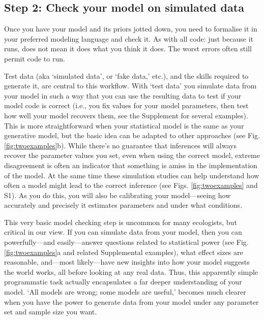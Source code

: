 \documentclass[11pt]{article}
\begin{document}
\subsection*{Step 2: Check your model on simulated data} 

Once you have your model and its priors jotted down, you need to formalise it in your preferred modeling language and check it. As with all code: just because it runs, does not mean it does what you think it does. The worst errors often still permit code to run. 

Test data (aka `simulated data', or  `fake data,' etc.), and the skills required to generate it, are central to this workflow. With `test data' you simulate data from your model in such a way that you can use the resulting data to test if your model code is correct (i.e., you fix values for your model parameters, then test how well your model recovers them, see the Supplement for several examples). This is more straightforward when your statistical model is the same as your generative model, but the basic idea can be adapted to other approaches (see Fig. \ref{fig:twoexamples}b). While there's no guarantee that inferences will always recover the parameter values you set, even when using the correct model, extreme disagreement is often an indicator that something is amiss in the implementation of the model. At the same time these simulation studies can help understand how often a model might lead to the correct inference (see Figs. \ref{fig:twoexamples} and S1). As you do this, you will also be calibrating your model---seeing how accurately and precisely it estimates parameters and under what conditions. 

This very basic model checking step is uncommon for many ecologists, but critical in our view. If you can simulate data from your model, then you can powerfully---and easily---answer questions related to statistical power (see Fig. \ref{fig:twoexamples}a and related Supplemental examples), what effect sizes are reasonable, and---most likely---have new insights into how your model suggests the world works, all before looking at any real data. Thus, this apparently simple programmatic task actually encapsulates a far deeper understanding of your model. `All models are wrong; some models are useful,' becomes much clearer when you have the power to generate data from your model under any parameter set and sample size you want.
\end{document}
